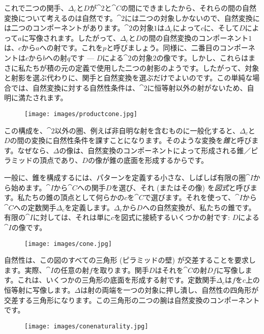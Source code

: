 \noindent
これで二つの関手、$\Delta_c$と$D$が$\cat{2}$と$\cat{C}$の間にできましたから、それらの間の自然変換について考えるのは自然です。$\cat{2}$には二つの対象しかないので、自然変換には二つのコンポーネントがあります。$\cat{2}$の対象$1$は$\Delta_c$によって$c$に、そして$D$によって$a$に写像されます。したがって、$\Delta_c$と$D$の間の自然変換のコンポーネント$1$は、$c$から$a$への射です。これを$p$と呼びましょう。同様に、二番目のコンポーネントは$c$から$b$への射$q$です --- $D$による$\cat{2}$の対象$2$の像です。しかし、これらはまさに私たちが積の元の定義で使用した二つの射影のようです。したがって、対象と射影を選ぶ代わりに、関手と自然変換を選ぶだけでよいのです。この単純な場合では、自然変換に対する自然性条件は、$\cat{2}$に恒等射以外の射がないため、自明に満たされます。

\begin{figure}[H]
  \centering
  \texttt{[image: images/productcone.jpg]}
\end{figure}

\noindent
この構成を、$\cat{2}$以外の圏、例えば非自明な射を含むものに一般化すると、$\Delta_c$と$D$の間の変換に自然性条件を課すことになります。そのような変換を\emph{錐}と呼びます。なぜなら、$\Delta$の像は、自然変換のコンポーネントによって形成される錐／ピラミッドの頂点であり、$D$の像が錐の底面を形成するからです。

一般に、錐を構成するには、パターンを定義する小さな、しばしば有限の圏$\cat{I}$から始めます。$\cat{I}$から$\cat{C}$への関手$D$を選び、それ (またはその像) を\emph{図式}と呼びます。私たちの錐の頂点として何らかの$c$を$\cat{C}$で選びます。それを使って、$\cat{I}$から$\cat{C}$への定数関手$\Delta_c$を定義します。$\Delta_c$から$D$への自然変換が、私たちの錐です。有限の$\cat{I}$に対しては、それは単に$c$を図式に接続するいくつかの射です: $D$による$\cat{I}$の像です。

\begin{figure}[H]
  \centering
  \texttt{[image: images/cone.jpg]}
\end{figure}

\noindent
自然性は、この図のすべての三角形 (ピラミッドの壁) が交差することを要求します。実際、$\cat{I}$の任意の射$f$を取ります。関手$D$はそれを$\cat{C}$の射$Df$に写像します。これは、いくつかの三角形の底面を形成する射です。定数関手$\Delta_c$は$f$を$c$上の恒等射に写像します。$\Delta$は射の両端を一つの対象に押し潰し、自然性の四角形が交差する三角形になります。この三角形の二つの腕は自然変換のコンポーネントです。

\begin{figure}[H]
  \centering
  \texttt{[image: images/conenaturality.jpg]}
\end{figure}

